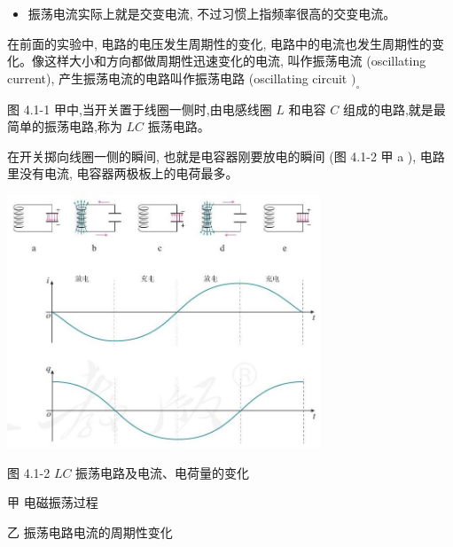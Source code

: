\documentclass[10pt]{article}
\begin{document}
\begin{mdframed}

\begin{itemize}
\item 振荡电流实际上就是交变电流, 不过习惯上指频率很高的交变电流。
\end{itemize}

\end{mdframed}

在前面的实验中, 电路的电压发生周期性的变化, 电路中的电流也发生周期性的变化。像这样大小和方向都做周期性迅速变化的电流, 叫作振荡电流 (oscillating current), 产生振荡电流的电路叫作振荡电路 (oscillating circuit \({)}_{ \circ }\)

图 4.1-1 甲中,当开关置于线圈一侧时,由电感线圈 \(L\) 和电容 \(C\) 组成的电路,就是最简单的振荡电路,称为 \({LC}\) 振荡电路。

在开关掷向线圈一侧的瞬间, 也就是电容器刚要放电的瞬间 (图 4.1-2 甲 a ), 电路里没有电流, 电容器两极板上的电荷最多。

\begin{center}
\includegraphics[max width=0.7\textwidth]{images/01910e72-c5b7-7ed5-a6d4-fb3a5faefc32_77_548712.jpg}
\end{center}

图 4.1-2 \({LC}\) 振荡电路及电流、电荷量的变化

\begin{mdframed}

甲 电磁振荡过程

\end{mdframed}

\begin{mdframed}

乙 振荡电路电流的周期性变化

\end{mdframed}
\end{document}
